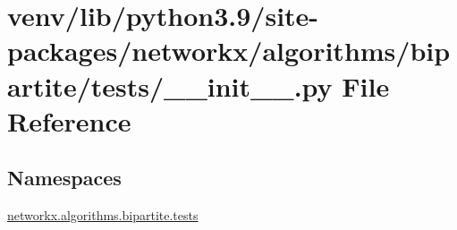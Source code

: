 \hypertarget{venv_2lib_2python3_89_2site-packages_2networkx_2algorithms_2bipartite_2tests_2____init_____8py}{}\section{venv/lib/python3.9/site-\/packages/networkx/algorithms/bipartite/tests/\+\_\+\+\_\+init\+\_\+\+\_\+.py File Reference}
\label{venv_2lib_2python3_89_2site-packages_2networkx_2algorithms_2bipartite_2tests_2____init_____8py}
\subsection*{Namespaces}
\begin{DoxyCompactItemize}
\item 
 \hyperlink{namespacenetworkx_1_1algorithms_1_1bipartite_1_1tests}{networkx.\+algorithms.\+bipartite.\+tests}
\end{DoxyCompactItemize}
